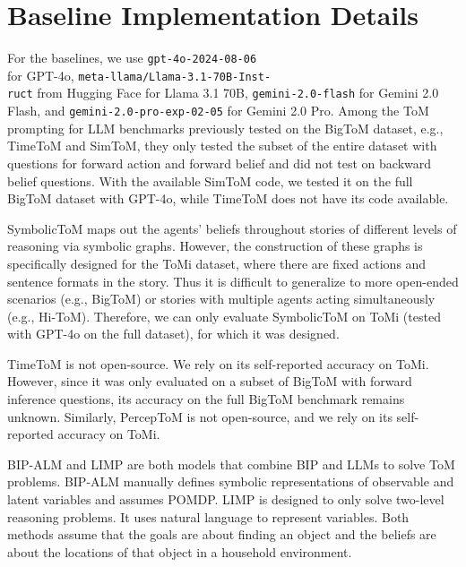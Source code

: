 \section{Baseline Implementation Details}
\label{sec:baseline_details}


For the baselines, we use \texttt{gpt-4o-2024-08-06\\} for GPT-4o, \texttt{meta-llama/Llama-3.1-70B-Inst-\\ruct} from Hugging Face for Llama 3.1 70B, \texttt{gemini-2.0-flash} for Gemini 2.0 Flash, and \texttt{gemini-2.0-pro-exp-02-05} for Gemini 2.0 Pro. 
Among the ToM prompting for LLM benchmarks previously tested on the BigToM dataset, e.g., TimeToM and SimToM, they only tested the subset of the entire dataset with questions for forward action and forward belief and did not test on backward belief questions. With the available SimToM code, we tested it on the full BigToM dataset with GPT-4o, while TimeToM does not have its code available. 


SymbolicToM maps out the agents' beliefs throughout stories of different levels of reasoning via symbolic graphs. However, the construction of these graphs is specifically designed for the ToMi dataset, where there are fixed actions and sentence formats in the story. Thus it is difficult to generalize to more open-ended scenarios (e.g., BigToM) or stories with multiple agents acting simultaneously (e.g., Hi-ToM). Therefore, we can only evaluate  SymbolicToM on ToMi (tested with GPT-4o on the full dataset), for which it was designed.  

TimeToM is not open-source. We rely on its self-reported accuracy on ToMi. However, since it was only evaluated on a subset of BigToM with forward inference questions, its accuracy on the full BigToM benchmark remains unknown. Similarly, PercepToM is not open-source, and we rely on its self-reported accuracy on ToMi.


BIP-ALM and LIMP are both models that combine BIP and LLMs to solve ToM problems. BIP-ALM manually defines symbolic representations of observable and latent variables and assumes POMDP. LIMP is designed to only solve two-level reasoning problems. It uses natural language to represent variables. Both methods assume that the goals are about finding an object and the beliefs are about the locations of that object in a household environment. 
